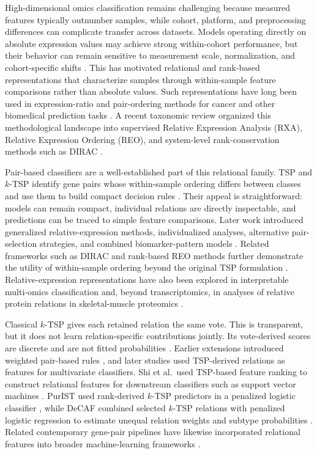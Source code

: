 \documentclass[preprint,12pt,a4paper]{elsarticle}
\begin{document}
High-dimensional omics classification remains challenging because measured features typically outnumber samples, while cohort, platform, and preprocessing differences can complicate transfer across datasets. Models operating directly on absolute expression values may achieve strong within-cohort performance, but their behavior can remain sensitive to measurement scale, normalization, and cohort-specific shifts \cite{Cheng2023,Kwan2023}. This has motivated relational and rank-based representations that characterize samples through within-sample feature comparisons rather than absolute values. Such representations have long been used in expression-ratio and pair-ordering methods for cancer and other biomedical prediction tasks \cite{Gordon2002,Bo2002,Geman2004,Wu2025}. A recent taxonomic review organized this methodological landscape into supervised Relative Expression Analysis (RXA), Relative Expression Ordering (REO), and system-level rank-conservation methods such as DIRAC \cite{Czajkowski2026Review}.

Pair-based classifiers are a well-established part of this relational family. TSP and $k$-TSP identify gene pairs whose within-sample ordering differs between classes and use them to build compact decision rules \cite{Geman2004,Tan2005}. Their appeal is straightforward: models can remain compact, individual relations are directly inspectable, and predictions can be traced to simple feature comparisons. Later work introduced generalized relative-expression methods, individualized analyses, alternative pair-selection strategies, and combined biomarker-pattern models \cite{Afsari2015,Wang2015,Magis2012,Moody2020,Huang2022}. Related frameworks such as DIRAC and rank-based REO methods further demonstrate the utility of within-sample ordering beyond the original TSP formulation \cite{Eddy2010,Chen2023,Yan2024,Jin2025}. Relative-expression representations have also been explored in interpretable multi-omics classification \cite{Czajkowski2025,Czajkowski2025MultiOmics} and, beyond transcriptomics, in analyses of relative protein relations in skeletal-muscle proteomics \cite{Czajkowska2024Proteomics}.

Classical $k$-TSP gives each retained relation the same vote. This is transparent, but it does not learn relation-specific contributions jointly. Its vote-derived scores are discrete and are not fitted probabilities \cite{Tan2005,Magis2012,Moody2020}. Earlier extensions introduced weighted pair-based rules \cite{Czajkowski2008WeightKTSP}, and later studies used TSP-derived relations as features for multivariate classifiers. Shi et al.\ used TSP-based feature ranking to construct relational features for downstream classifiers such as support vector machines \cite{Shi2011TSPML}. PurIST used rank-derived $k$-TSP predictors in a penalized logistic classifier \cite{Rashid2020PurIST}, while DeCAF combined selected $k$-TSP relations with penalized logistic regression to estimate unequal relation weights and subtype probabilities \cite{Peng2026DeCAF}. Related contemporary gene-pair pipelines have likewise incorporated relational features into broader machine-learning frameworks \cite{Huang2022,Wu2025,Wu2026PTBD}.
\end{document}
